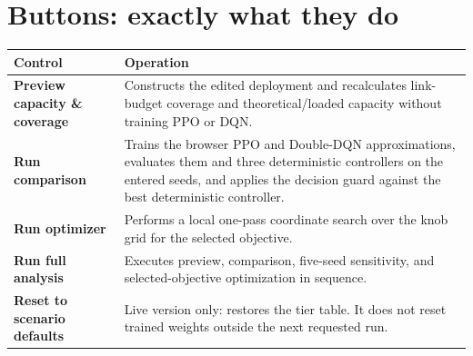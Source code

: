 \documentclass[10pt]{article}
\newcommand{\ui}[1]{\textsf{\textbf{#1}}}
\begin{document}
\section{Buttons: exactly what they do}
\begin{tabular}{>{\raggedright\arraybackslash}p{}>{\raggedright\arraybackslash}p{}}
\toprule
Control & Operation\\
\midrule
\ui{Preview capacity \& coverage} & Constructs the edited deployment and recalculates link-budget coverage and theoretical/loaded capacity without training PPO or DQN.\\
\ui{Run comparison} & Trains the browser PPO and Double-DQN approximations, evaluates them and three deterministic controllers on the entered seeds, and applies the decision guard against the best deterministic controller.\\
\ui{Run optimizer} & Performs a local one-pass coordinate search over the knob grid for the selected objective.\\
\ui{Run full analysis} & Executes preview, comparison, five-seed sensitivity, and selected-objective optimization in sequence.\\
\ui{Reset to scenario defaults} & Live version only: restores the tier table. It does not reset trained weights outside the next requested run.\\
\bottomrule
\end{tabular}
\end{document}
